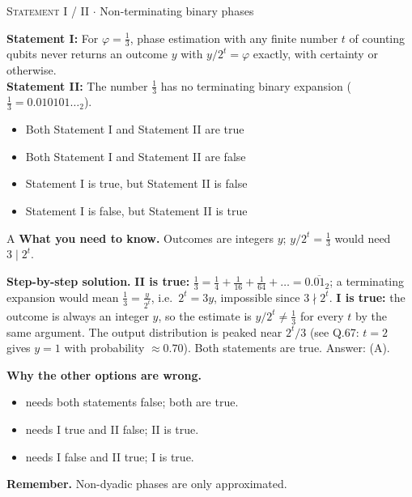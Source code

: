 \documentclass[11pt,a4paper]{article}
\newcommand{\optlabel}[1]{\textbf{(#1)}}
\newcommand{\correctlabel}[1]{\textcolor{okgreen}{\textbf{(#1)}\,\ding{51}}}
\newenvironment{qitem}[1]{\begin{list}{}{\setlength{\leftmargin}{3.3em}\setlength{\labelwidth}{3.1em}%
  \setlength{\labelsep}{0.2em}\setlength{\topsep}{3pt}\setlength{\parsep}{3pt}}\item[\textbf{Q.#1}\hfill]}{\end{list}}
\newcommand{\qsep}{\par\vspace{2pt}{\color{black!15}\hrule}\vspace{4pt}}
\newcommand{\qmeta}[2]{{\footnotesize\color{black!60}\textsc{#1} \;$\cdot$\; #2}\par}
\begin{document}
\begin{qitem}{78}
\qmeta{Statement I / II}{Non-terminating binary phases}
\textbf{Statement I:} For $\varphi = \frac13$, phase estimation with any finite number $t$ of counting qubits never returns an
outcome $y$ with $y/2^t = \varphi$ exactly, with certainty or otherwise.\\[1mm]
\textbf{Statement II:} The number $\frac13$ has no terminating binary expansion ($\frac13 = 0.010101\ldots_2$).
\begin{itemize}[leftmargin=2.6em, labelsep=0.4em, itemsep=2pt, topsep=3pt]
\item[\correctlabel{A}] Both Statement I and Statement II are true
\item[\optlabel{B}] Both Statement I and Statement II are false
\item[\optlabel{C}] Statement I is true, but Statement II is false
\item[\optlabel{D}] Statement I is false, but Statement II is true
\end{itemize}
\end{qitem}
\begin{solbox}{A}
\textbf{\color{brand}What you need to know.} Outcomes are integers $y$; $y/2^t = \frac13$ would need $3 \mid 2^t$.

\textbf{\color{brand}Step-by-step solution.} \textbf{II is true:} $\frac13 = \frac14 + \frac1{16} + \frac1{64} + \dots = 0.\overline{01}_2$; a terminating expansion would mean
$\frac13 = \frac{y}{2^t}$, i.e.\ $2^t = 3y$, impossible since $3 \nmid 2^t$. \textbf{I is true:} the outcome is always an integer
$y$, so the estimate is $y/2^t \ne \frac13$ for every $t$ by the same argument. The output distribution is peaked near
$2^t/3$ (see Q.67: $t = 2$ gives $y = 1$ with probability $\approx 0.70$). Both statements are true. Answer: (A).

\textbf{\color{brand}Why the other options are wrong.}
\begin{itemize}[leftmargin=2.4em, itemsep=1pt, topsep=2pt]
\item[\textbf{(B)}] needs both statements false; both are true.
\item[\textbf{(C)}] needs I true and II false; II is true.
\item[\textbf{(D)}] needs I false and II true; I is true.
\end{itemize}
\textbf{\color{brand}Remember.} Non-dyadic phases are only approximated.
\end{solbox}
\qsep
\end{document}
